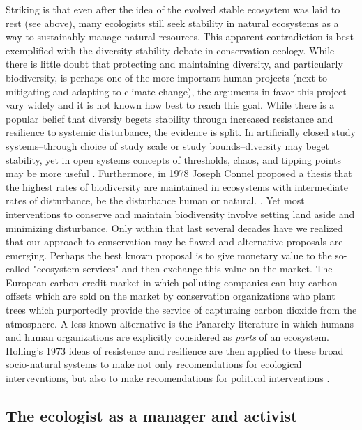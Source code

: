 Striking is that even after the idea of the evolved stable ecosystem was laid to rest (see above), many ecologists still seek stability in natural ecosystems as a way to sustainably manage natural resources. This apparent contradiction is best exemplified with the diversity-stability debate in conservation ecology. While there is little doubt that protecting and maintaining diversity, and particularly biodiversity, is perhaps one of the more important human projects (next to mitigating and adapting to climate change), the arguments in favor this project vary widely and it is not known how best to reach this goal. While there is a popular belief that diversiy begets stability through increased resistance and resilience to systemic disturbance, the evidence is split. In artificially closed study systems--through choice of study scale or study bounds--diversity may beget stability, yet in open systems concepts of thresholds, chaos, and tipping points may be more useful \cite[for opposing arguments see][]{tilman_1994,goodman_1975}. Furthermore, in 1978 Joseph Connel proposed a thesis that the highest rates of biodiversity are maintained in ecosystems with intermediate rates of disturbance, be the disturbance human or natural. \cite{connel_1978}. Yet most interventions to conserve and maintain biodiversity involve setting land aside and minimizing disturbance. Only within that last several decades have we realized that our approach to conservation may be flawed and alternative proposals are emerging. Perhaps the best known proposal is to give monetary value to the so-called "ecosystem services" and then exchange this value on the market. The European carbon credit market in which polluting companies can buy carbon offsets which are sold on the market by conservation organizations who plant trees which purportedly provide the service of capturaing carbon dioxide from the atmosphere. A less known alternative is the Panarchy literature in which humans and human organizations are explicitly considered as \textit{parts} of an ecosystem. Holling's 1973 ideas of resistence and resilience are then applied to these broad socio-natural systems to make not only recomendations for ecological intervevntions, but also to make recomendations for political interventions \cite{holling_2002}.

\subsection{The ecologist as a manager and activist}

